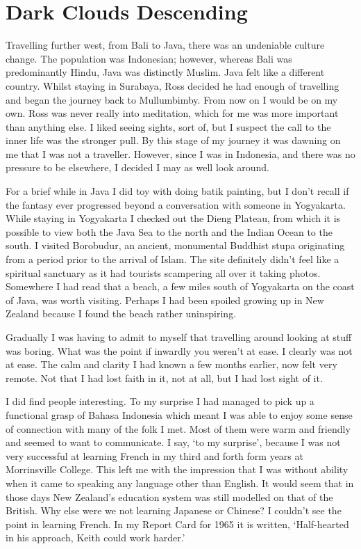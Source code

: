 \chapter{Dark Clouds Descending}

Travelling further west, from Bali to Java, there was an undeniable
culture change. The population was Indonesian; however, whereas
Bali was predominantly Hindu, Java was distinctly Muslim. Java felt like
a different country. Whilst staying in Surabaya, Ross decided he had
enough of travelling and began the journey back to Mullumbimby. From now
on I would be on my own. Ross was never really into meditation, which
for me was more important than anything else. I liked seeing sights,
sort of, but I suspect the call to the inner life was the stronger pull.
By this stage of my journey it was dawning on me that I was not a
traveller. However, since I was in Indonesia, and there was no pressure
to be elsewhere, I decided I may as well look around.

For a brief while in Java I did toy with doing batik painting, but I
don't recall if the fantasy ever progressed beyond a conversation with
someone in Yogyakarta. While staying in Yogyakarta I checked out the
Dieng Plateau, from which it is possible to view both the Java Sea to
the north and the Indian Ocean to the south. I visited Borobudur\cite{borobudur},
an ancient, monumental Buddhist stupa originating from a
period prior to the arrival of Islam. The site definitely didn't feel
like a spiritual sanctuary as it had tourists scampering all over it
taking photos. Somewhere I had read that a beach, a
few miles south of Yogyakarta on the coast of Java, was worth visiting.
Perhaps I had been spoiled growing up in New Zealand because I found the
beach rather uninspiring.

Gradually I was having to admit to myself that travelling around looking
at stuff was boring. What was the point if inwardly you weren't at ease.
I clearly was not at ease. The calm and clarity I had known a few months
earlier, now felt very remote. Not that I had lost faith in it, not at
all, but I had lost sight of it.

I did find people interesting. To my surprise I had managed to pick up a
functional grasp of Bahasa Indonesia\cite{bahasa}
which meant I was able to enjoy some sense of
connection with many of the folk I met. Most of them were warm and
friendly and seemed to want to communicate. I say, `to my surprise', because
I was not very successful at learning French in my third and forth form
years at Morrinsville College. This left me with the impression that I
was without ability when it came to speaking any language other than
English. It would seem that in those days New Zealand's education system
was still modelled on that of the British. Why else were we not learning
Japanese or Chinese? I couldn't see the point in learning French. In my
Report Card for 1965 it is written, `Half-hearted in his approach, Keith
could work harder.'

